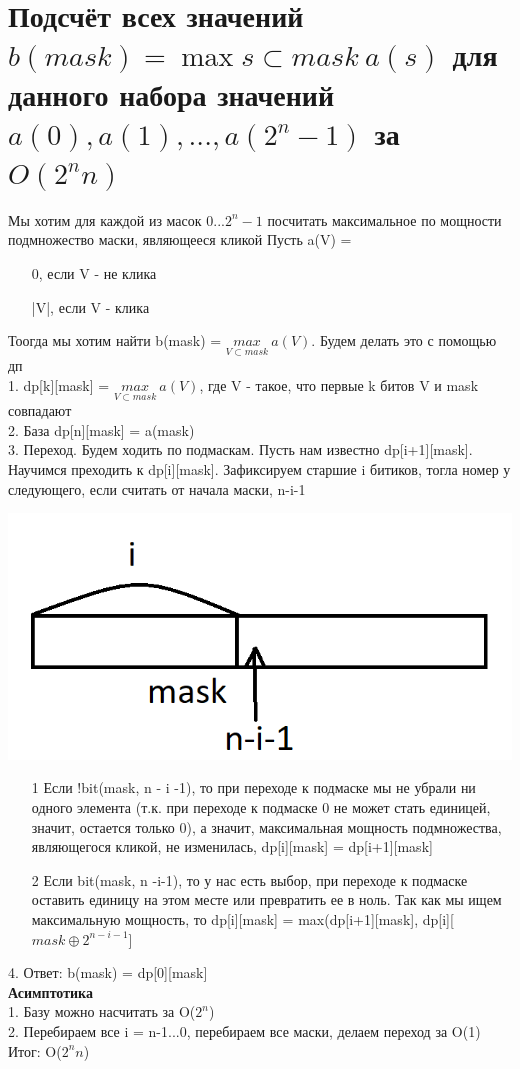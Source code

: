 \section{Подсчёт всех значений \texorpdfstring{$b(mask) = \max{s \subset mask} \ a(s)$}{b(mask)} для данного набора значений $a(0), a(1), ..., a(2^n-1)$ за $O(2^nn)$}
 Мы хотим для каждой из масок 0...$2^n - 1$ посчитать максимальное по мощности подмножество маски, являющееся кликой
 Пусть a(V) = 
 \begin{itemize}
     \item [] 0, если V - не клика
     \item[]|V|, если V - клика
 \end{itemize}
 Тоогда мы хотим найти   b(mask) = $\underset{V \subset mask}{max} \ a(V)$. Будем делать это с помощью дп\\
 1. dp[k][mask] = $\underset{V \subset mask}{max} \ a(V)$, где V - такое, что первые k битов V и mask совпадают \\
 2. База dp[n][mask] = a(mask)\\
 3. Переход. Будем ходить по подмаскам. Пусть нам известно dp[i+1][mask]. Научимся преходить к dp[i][mask]. Зафиксируем старшие i битиков, тогла номер у следующего, если считать от начала маски, n-i-1 
 \begin{center}
     \includegraphics[width=17cm]{images/18-24_alg4.PNG}
 \end{center}
 \begin{itemize}
     \item [1]  Если !bit(mask, n - i -1), то при переходе к подмаске мы не убрали ни одного элемента (т.к. при переходе к подмаске 0 не может стать единицей, значит, остается только 0), а значит, максимальная мощность подмножества, являющегося кликой, не изменилась, dp[i][mask] = dp[i+1][mask]
     \item [2]  Если bit(mask, n -i-1), то у нас есть выбор, при переходе к подмаске оставить единицу на этом месте или превратить ее в ноль. Так как мы ищем максимальную мощность, то dp[i][mask] = max(dp[i+1][mask], dp[i][$mask \oplus 2^{n - i- 1}$]
 \end{itemize}
 4. Ответ: b(mask) = dp[0][mask]\\
 \textbf{Асимптотика}\\ 
 1. Базу можно насчитать за O($2^n$)\\
 2. Перебираем все i = n-1...0, перебираем все маски, делаем переход за O(1)
 \\
 Итог: O($2^n n$)
 
